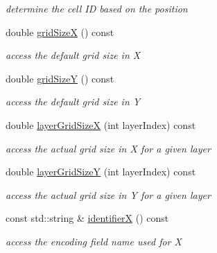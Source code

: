 \begin{DoxyCompactItemize}
\begin{DoxyCompactList}\small\item\em determine the cell ID based on the position \item\end{DoxyCompactList}\item 
double \hyperlink{class_d_d4hep_1_1_d_d_segmentation_1_1_tiled_layer_segmentation_a259da236fc6000191d8501aeeb2fa0de}{gridSizeX} () const 
\begin{DoxyCompactList}\small\item\em access the default grid size in X \item\end{DoxyCompactList}\item 
double \hyperlink{class_d_d4hep_1_1_d_d_segmentation_1_1_tiled_layer_segmentation_a3319e4007ffe0ea34721e3dcfd5fb4fd}{gridSizeY} () const 
\begin{DoxyCompactList}\small\item\em access the default grid size in Y \item\end{DoxyCompactList}\item 
double \hyperlink{class_d_d4hep_1_1_d_d_segmentation_1_1_tiled_layer_segmentation_a4e1ba517985d9b161705c9defef89640}{layerGridSizeX} (int layerIndex) const 
\begin{DoxyCompactList}\small\item\em access the actual grid size in X for a given layer \item\end{DoxyCompactList}\item 
double \hyperlink{class_d_d4hep_1_1_d_d_segmentation_1_1_tiled_layer_segmentation_ae7faae312b547313ca0e139bc8973149}{layerGridSizeY} (int layerIndex) const 
\begin{DoxyCompactList}\small\item\em access the actual grid size in Y for a given layer \item\end{DoxyCompactList}\item 
const std::string \& \hyperlink{class_d_d4hep_1_1_d_d_segmentation_1_1_tiled_layer_segmentation_aaa6a75aa2ebbb603f8a0cf4d843c8211}{identifierX} () const 
\begin{DoxyCompactList}\small\item\em access the encoding field name used for X \item\end{DoxyCompactList}\item 

\end{DoxyCompactItemize}
